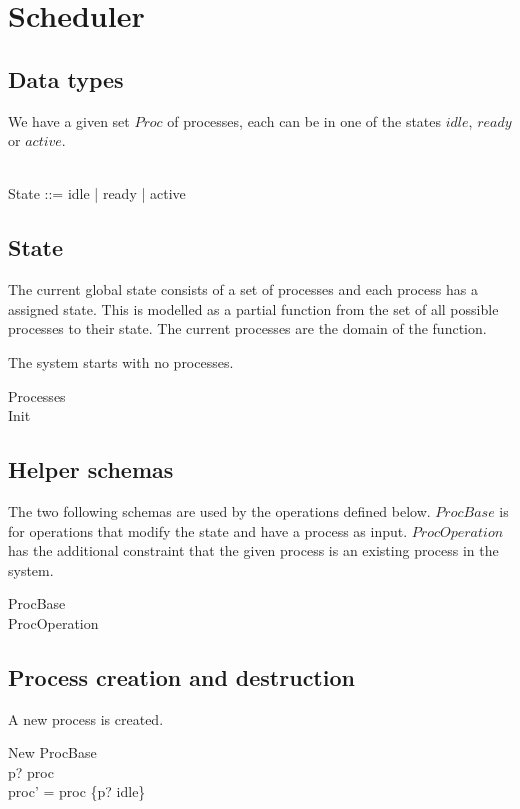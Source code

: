\documentclass[a4paper]{article}
\begin{document}
\section*{Scheduler}
\subsection*{Data types}
We have a given set $Proc$ of processes, each can be in one of
the states $idle$, $ready$ or $active$.
\begin{zed}
  [Proc]\\
  State ::= idle | ready | active\\
\end{zed}

\subsection*{State}
The current global state consists of a set of processes and each process
has a assigned state. This is modelled as a partial function from the
set of all possible processes to their state. The current processes
are the domain of the function.

The system starts with no processes.
\begin{zed}
  Processes \\
  Init \\
\end{zed}


\subsection*{Helper schemas}
The two following schemas are used by the operations defined
below. $ProcBase$ is for operations that modify the state and
have a process as input. $ProcOperation$ has the additional
constraint that the given process is an existing process in
the system.
\begin{zed}
  ProcBase \\
  ProcOperation   
\end{zed}


\subsection*{Process creation and destruction}
A new process is created.
\begin{schema}{New}
  ProcBase\\
  \where
  p? \notin \dom proc\\
  proc' = proc \oplus \{p? \mapsto idle\}
\end{schema}
\end{document}
